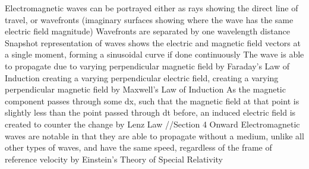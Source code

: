 \documentclass[11 pt, twoside]{article}
\newenvironment{outline*}
{
	\begin{outline}[enumerate]
	}
	{\end{outline}
}
\begin{document}
\begin{outline*}
\1 Electromagnetic waves can be portrayed either as rays showing the direct line of travel, or wavefronts (imaginary surfaces showing where the wave has the same electric field magnitude)
\2 Wavefronts are separated by one wavelength distance
\2 Snapshot representation of waves shows the electric and magnetic field vectors at a single moment, forming a sinusoidal curve if done continuously
\1 The wave is able to propagate due to varying perpendicular magnetic field by Faraday's Law of  Induction creating a varying perpendicular electric field, creating a varying perpendicular magnetic field by Maxwell's Law of Induction
\2 As the magnetic component passes through some dx, such that the magnetic field at that point is slightly less than the point passed through dt before, an induced electric field is created to counter the change by Lenz Law
\2 //Section 4 Onward 
\1 Electromagnetic waves are notable in that they are able to propagate without a medium, unlike all other types of waves, and have the same speed, regardless of the frame of reference velocity by Einstein's Theory of Special Relativity
\end{outline*}

\end{document}
